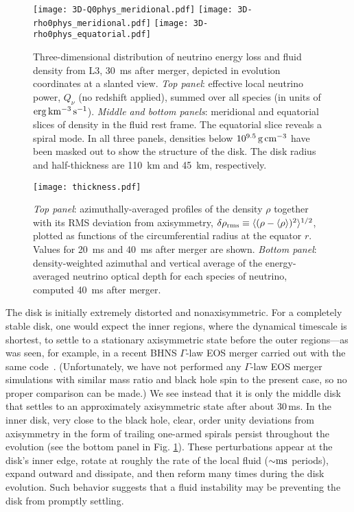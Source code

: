\begin{figure}
\texttt{[image: 3D-Q0phys\_meridional.pdf]}
\texttt{[image: 3D-rho0phys\_meridional.pdf]}
\texttt{[image: 3D-rho0phys\_equatorial.pdf]}
\caption{
Three-dimensional distribution of neutrino energy loss and fluid density
from L3, 30~ms after merger, depicted in evolution coordinates at a slanted view.
{\em Top panel}: effective local neutrino power, $Q_{\nu}$ (no redshift applied),
summed over all species (in units of $\rm erg\,km^{-3}\,s^{-1}$).
{\em Middle and bottom panels}: meridional and equatorial slices of
density in the fluid rest frame. The equatorial slice reveals a spiral mode.
In all three panels, densities below $10^{9.5}\rm\,g\,cm^{-3}$ have been masked out
to show the structure of the disk. The disk radius and half-thickness
are 110~km and 45~km, respectively.
}
\label{fig:disksnapshot}
\end{figure}

\begin{figure}
\texttt{[image: thickness.pdf]}
\caption{{\em Top panel}: azimuthally-averaged profiles of the
density $\rho$ together with its RMS deviation from axisymmetry,
$\delta\rho_{\rm rms}\equiv \langle(\rho-\langle\rho\rangle)^2\rangle^{1/2}$,
plotted as functions of the circumferential radius
at the equator $r$.  Values for 20~ms and 40~ms after merger are shown.  
{\em Bottom panel}: density-weighted azimuthal and vertical average of
the energy-averaged neutrino optical depth for each species of neutrino,
computed 40~ms after merger.}
\label{fig:thickness}
\end{figure}

The disk is initially extremely distorted and nonaxisymmetric.  For
a completely stable disk, one would expect the inner regions, where
the dynamical timescale is shortest, to settle to a stationary
axisymmetric state before the outer regions---as was seen, for example,
in a recent BHNS $\Gamma$-law EOS merger carried out with the same
code~\citep{Lovelace:2013vma}.  (Unfortunately, we have not performed
any $\Gamma$-law EOS merger simulations with similar mass ratio and
black hole spin to the present case, so no proper comparison can be
made.)  We see instead that it is only the
middle disk that settles to an approximately axisymmetric state after
about 30\,ms. 
In the inner disk, very close to the black hole, clear, order unity
deviations from axisymmetry in the form of trailing one-armed spirals
persist throughout the evolution (see the bottom panel in Fig.
\ref{fig:disksnapshot}).  These perturbations appear at the
disk's inner edge, rotate at roughly the rate of the local fluid
($\mathord{\sim}\rm ms$ periods), expand outward and dissipate, and then reform
many times during the disk evolution.  Such behavior suggests that
a fluid instability may be preventing the disk from promptly settling.


